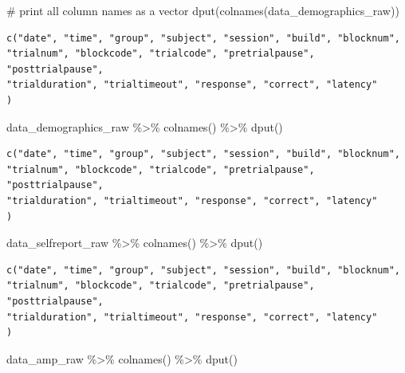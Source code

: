 \documentclass[
  letterpaper,
  DIV=11,
  numbers=noendperiod]{scrreprt}
\newenvironment{Shaded}{\begin{snugshade}}{\end{snugshade}}
\newcommand{\CommentTok}[1]{\textcolor[rgb]{0.37,0.37,0.37}{#1}}
\newcommand{\FunctionTok}[1]{\textcolor[rgb]{0.28,0.35,0.67}{#1}}
\newcommand{\NormalTok}[1]{\textcolor[rgb]{0.00,0.23,0.31}{#1}}
\newcommand{\SpecialCharTok}[1]{\textcolor[rgb]{0.37,0.37,0.37}{#1}}
\begin{document}
\begin{Shaded}
\begin{Highlighting}[]
\CommentTok{\# print all column names as a vector}
\FunctionTok{dput}\NormalTok{(}\FunctionTok{colnames}\NormalTok{(data\_demographics\_raw))}
\end{Highlighting}
\end{Shaded}

\begin{verbatim}
c("date", "time", "group", "subject", "session", "build", "blocknum", 
"trialnum", "blockcode", "trialcode", "pretrialpause", "posttrialpause", 
"trialduration", "trialtimeout", "response", "correct", "latency"
)
\end{verbatim}

\begin{Shaded}
\begin{Highlighting}[]
\NormalTok{data\_demographics\_raw }\SpecialCharTok{\%\textgreater{}\%}
  \FunctionTok{colnames}\NormalTok{() }\SpecialCharTok{\%\textgreater{}\%}
  \FunctionTok{dput}\NormalTok{()}
\end{Highlighting}
\end{Shaded}

\begin{verbatim}
c("date", "time", "group", "subject", "session", "build", "blocknum", 
"trialnum", "blockcode", "trialcode", "pretrialpause", "posttrialpause", 
"trialduration", "trialtimeout", "response", "correct", "latency"
)
\end{verbatim}

\begin{Shaded}
\begin{Highlighting}[]
\NormalTok{data\_selfreport\_raw }\SpecialCharTok{\%\textgreater{}\%}
  \FunctionTok{colnames}\NormalTok{() }\SpecialCharTok{\%\textgreater{}\%}
  \FunctionTok{dput}\NormalTok{()}
\end{Highlighting}
\end{Shaded}

\begin{verbatim}
c("date", "time", "group", "subject", "session", "build", "blocknum", 
"trialnum", "blockcode", "trialcode", "pretrialpause", "posttrialpause", 
"trialduration", "trialtimeout", "response", "correct", "latency"
)
\end{verbatim}

\begin{Shaded}
\begin{Highlighting}[]
\NormalTok{data\_amp\_raw }\SpecialCharTok{\%\textgreater{}\%}
  \FunctionTok{colnames}\NormalTok{() }\SpecialCharTok{\%\textgreater{}\%}
  \FunctionTok{dput}\NormalTok{()}
\end{Highlighting}
\end{Shaded}
\end{document}

